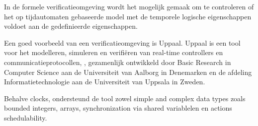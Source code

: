 \documentclass{article}
\begin{document}
In de formele verificatieomgeving wordt het mogelijk gemaak om te controleren of het op tijdautomaten gebaseerde model  met de temporele logische eigenschappen  voldoet aan de gedefinieerde eigenschappen.    


Een goed voorbeeld van een verificatieomgeving is Uppaal. Uppaal is een tool voor het modelleren, simuleren en verifiëren van real-time  controllers en communicatieprotocollen,  , gezamenlijk ontwikkeld door Basic Research in Computer Science aan de Universiteit van Aalborg in Denemarken en de afdeling Informatietechnologie aan de Universiteit van Uppsala in Zweden.

Behalve clocks, ondersteund de tool   zowel simple and complex data types zoals bounded integers, arrays, synchronization via shared variablelen en actions schedulability.



	
%	
%
%
%	
% 
%	
%	
\end{document}
